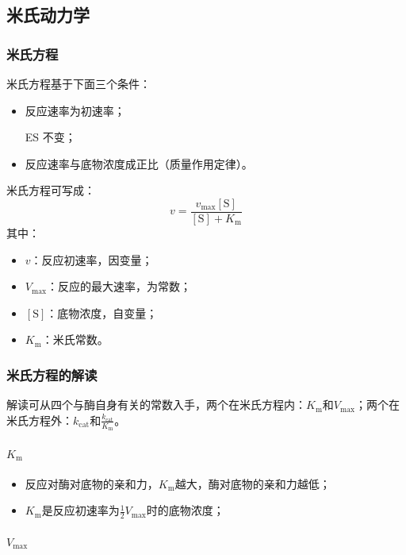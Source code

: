 \subsection{米氏动力学}

\subsubsection{米氏方程}

米氏方程基于下面三个条件：
\begin{itemize}
	\item 反应速率为初速率；
	\item [ES]不变；
	\item 反应速率与底物浓度成正比（质量作用定律）。
\end{itemize}

米氏方程可写成：
\[v=\frac{v_{\text{max}}[\text{S}]}{[\text{S}]+K_{\text{m}}}\]
其中：
\begin{itemize}
	\item $v$：反应初速率，因变量；
	\item $V_{\text{max}}$：反应的最大速率，为常数；
	\item $[\text{S}]$：底物浓度，自变量；
	\item $K_{\text{m}}$：米氏常数。
\end{itemize}

\subsubsection{米氏方程的解读}

解读可从四个与酶自身有关的常数入手，两个在米氏方程内：$K_{\text{m}}$和$V_{\text{max}}$；两个在米氏方程外：$k_{\text{cat}}$和$\displaystyle\frac{k_{\text{cat}}}{K_{\text{m}}}$。

\paragraph{$K_{\text{m}}$}

\begin{itemize}
	\item 反应对酶对底物的亲和力，$K_{\text{m}}$越大，酶对底物的亲和力越低；
	\item $K_{\text{m}}$是反应初速率为$\displaystyle\frac{1}{2} V_{\text{max}}$时的底物浓度；
\end{itemize}

\paragraph{$V_{\text{max}}$}

